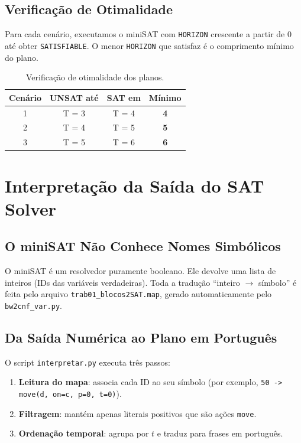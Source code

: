 \documentclass[12pt,a4paper]{article}
\begin{document}
\subsection{Verificação de Otimalidade}

Para cada cenário, executamos o miniSAT com \texttt{HORIZON} crescente a partir de $0$ até obter \texttt{SATISFIABLE}. O menor \texttt{HORIZON} que satisfaz é o comprimento mínimo do plano.

\begin{table}[h!]
\centering
\begin{tabular}{@{}cccc@{}}
\toprule
\textbf{Cenário} & \textbf{UNSAT até} & \textbf{SAT em} & \textbf{Mínimo} \\
\midrule
1 & T = 3 & T = 4 & \textbf{4} \\
2 & T = 4 & T = 5 & \textbf{5} \\
3 & T = 5 & T = 6 & \textbf{6} \\
\bottomrule
\end{tabular}
\caption{Verificação de otimalidade dos planos.}
\end{table}

\section{Interpretação da Saída do SAT Solver}
\label{sec:interpretacao}

\subsection{O miniSAT Não Conhece Nomes Simbólicos}

O miniSAT é um resolvedor puramente booleano. Ele devolve uma lista de inteiros (IDs das variáveis verdadeiras). Toda a tradução ``inteiro $\to$ símbolo'' é feita pelo arquivo \texttt{trab01\_blocos2SAT.map}, gerado automaticamente pelo \texttt{bw2cnf\_var.py}.

\subsection{Da Saída Numérica ao Plano em Português}

O script \texttt{interpretar.py} executa três passos:

\begin{enumerate}[leftmargin=1.2cm]
    \item \textbf{Leitura do mapa}: associa cada ID ao seu símbolo (por exemplo, \texttt{50 -> move(d, on=c, p=0, t=0)}).
    \item \textbf{Filtragem}: mantém apenas literais positivos que são ações \texttt{move}.
    \item \textbf{Ordenação temporal}: agrupa por $t$ e traduz para frases em português.
\end{enumerate}
\end{document}

